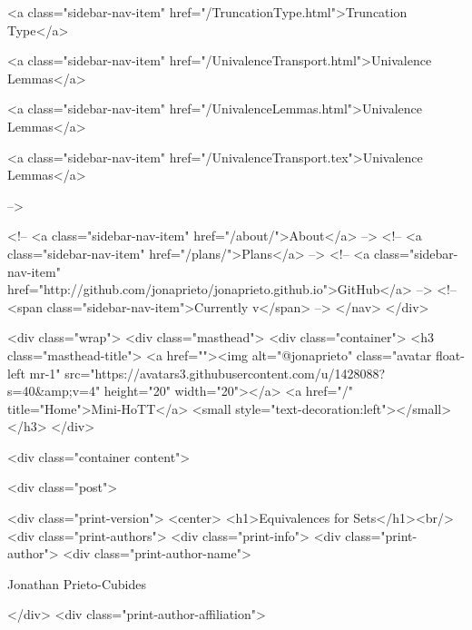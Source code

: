       
    
      
        
          <a class="sidebar-nav-item" href="/TruncationType.html">Truncation Type</a>
        
      
    
      
        
          <a class="sidebar-nav-item" href="/UnivalenceTransport.html">Univalence Lemmas</a>
        
      
    
      
        
          <a class="sidebar-nav-item" href="/UnivalenceLemmas.html">Univalence Lemmas</a>
        
      
    
      
        
          <a class="sidebar-nav-item" href="/UnivalenceTransport.tex">Univalence Lemmas</a>
        
      
     -->

    <!-- <a class="sidebar-nav-item" href="/about/">About</a> -->
    <!-- <a class="sidebar-nav-item" href="/plans/">Plans</a> -->
    <!-- <a class="sidebar-nav-item" href="http://github.com/jonaprieto/jonaprieto.github.io">GitHub</a> -->
    <!-- <span class="sidebar-nav-item">Currently v</span> -->
  </nav>
</div>

    <div class="wrap">
      <div class="masthead">
        <div class="container">
          <h3 class="masthead-title">
            <a href=""><img alt="@jonaprieto" class="avatar float-left mr-1" src="https://avatars3.githubusercontent.com/u/1428088?s=40&amp;v=4" height="20" width="20"></a>
            <a href="/" title="Home">Mini-HoTT</a>
            <small style="text-decoration:left"></small>
          </h3>
        </div>
      
      <div class="container content">
        







<div class="post">

  <div class="print-version">
    <center>
      <h1>Equivalences for Sets</h1><br/>
        <div class="print-authors">
          <div class="print-info">
            <div class="print-author">
              <div class="print-author-name">
                
                  Jonathan Prieto-Cubides
                
              </div>
              <div class="print-author-affiliation">
                
